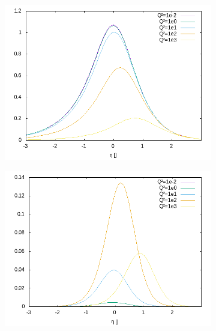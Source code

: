 \begin{figure}[ht!]
\centering
\begin{subfigure}[t]{.3\textwidth}
	\includegraphics[width=\textwidth]{../../img2/partonic/cg0_VV_F2}
\end{subfigure}%
\begin{subfigure}[t]{.3\textwidth}
	\includegraphics[width=\textwidth]{../../img2/partonic/cg0_VV_FL}
\end{subfigure}%
\begin{subfigure}[t]{.3\textwidth}

\end{subfigure}
\end{figure}
